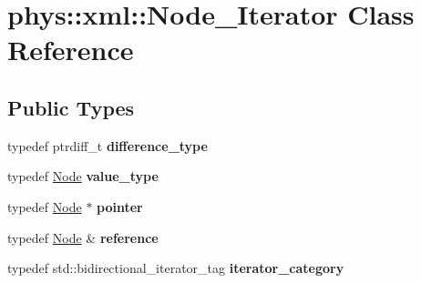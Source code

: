 \hypertarget{classphys_1_1xml_1_1Node__Iterator}{
\section{phys::xml::Node\_\-Iterator Class Reference}
\label{d5/d93/classphys_1_1xml_1_1Node__Iterator}
}
\subsection*{Public Types}
\begin{DoxyCompactItemize}
\item 
\hypertarget{classphys_1_1xml_1_1Node__Iterator_a253d28b024a4561e61e30082873afdac}{
typedef ptrdiff\_\-t {\bfseries difference\_\-type}}
\label{d5/d93/classphys_1_1xml_1_1Node__Iterator_a253d28b024a4561e61e30082873afdac}

\item 
\hypertarget{classphys_1_1xml_1_1Node__Iterator_a4b9fcc812bc05c889c26d5f94bc7ce2e}{
typedef \hyperlink{classphys_1_1xml_1_1Node}{Node} {\bfseries value\_\-type}}
\label{d5/d93/classphys_1_1xml_1_1Node__Iterator_a4b9fcc812bc05c889c26d5f94bc7ce2e}

\item 
\hypertarget{classphys_1_1xml_1_1Node__Iterator_a6d57a6c430f8d43986be8d5365257caa}{
typedef \hyperlink{classphys_1_1xml_1_1Node}{Node} $\ast$ {\bfseries pointer}}
\label{d5/d93/classphys_1_1xml_1_1Node__Iterator_a6d57a6c430f8d43986be8d5365257caa}

\item 
\hypertarget{classphys_1_1xml_1_1Node__Iterator_a5b6609463933af73ee3ae2bbce77bf0f}{
typedef \hyperlink{classphys_1_1xml_1_1Node}{Node} \& {\bfseries reference}}
\label{d5/d93/classphys_1_1xml_1_1Node__Iterator_a5b6609463933af73ee3ae2bbce77bf0f}

\item 
\hypertarget{classphys_1_1xml_1_1Node__Iterator_a4bd38ac054ea751d4c8ec4fb12da3686}{
typedef std::bidirectional\_\-iterator\_\-tag {\bfseries iterator\_\-category}}
\label{d5/d93/classphys_1_1xml_1_1Node__Iterator_a4bd38ac054ea751d4c8ec4fb12da3686}

\end{DoxyCompactItemize}
